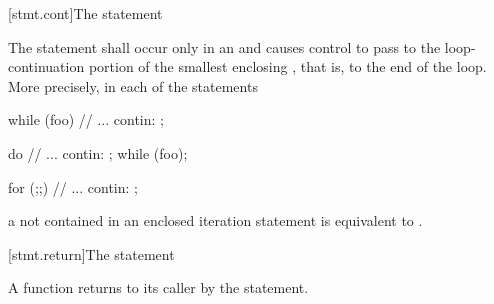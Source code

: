 [stmt.cont]{The  statement}%

\pnum
The
statement shall occur only in an
%
and causes control to pass to the loop-continuation portion of the
smallest enclosing , that is, to the end
of the loop. More precisely, in each of the statements

\begin{minipage}{.30\hsize}
\begin{codeblock}
while (foo) {
  {
    // ...
  }
contin: ;
}
\end{codeblock}
\end{minipage}
\begin{minipage}{.30\hsize}
\begin{codeblock}
do {
  {
    // ...
  }
contin: ;
} while (foo);
\end{codeblock}
\end{minipage}
\begin{minipage}{.30\hsize}
\begin{codeblock}
for (;;) {
  {
    // ...
  }
contin: ;
}
\end{codeblock}
\end{minipage}

a  not contained in an enclosed iteration statement is
equivalent to  .

[stmt.return]{The  statement}%
%
%

\pnum
A function returns to its caller by the  statement.

